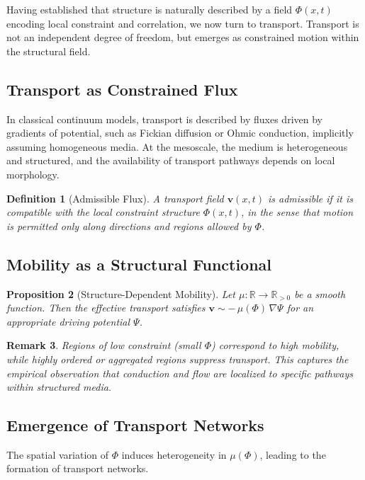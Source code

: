 \documentclass[11pt, a4paper, twocolumn]{article}
\newtheorem{definition}{Definition}[section]
\newtheorem{proposition}[definition]{Proposition}
\newtheorem{remark}[definition]{Remark}
\begin{document}
Having established that structure is naturally described by a field $\Phi(x,t)$
encoding local constraint and correlation, we now turn to transport. Transport
is not an independent degree of freedom, but emerges as constrained motion
within the structural field.

\subsection{Transport as Constrained Flux}

In classical continuum models, transport is described by fluxes driven by
gradients of potential, such as Fickian diffusion or Ohmic conduction, implicitly
assuming homogeneous media. At the mesoscale, the medium is heterogeneous and
structured, and the availability of transport pathways depends on local
morphology.

\begin{definition}[Admissible Flux]
A transport field $\mathbf{v}(x,t)$ is admissible if it is compatible with
the local constraint structure $\Phi(x,t)$, in the sense that motion is
permitted only along directions and regions allowed by $\Phi$.
\end{definition}

\subsection{Mobility as a Structural Functional}

\begin{proposition}[Structure-Dependent Mobility]
Let $\mu : \mathbb{R} \to \mathbb{R}_{>0}$ be a smooth function. Then the
effective transport satisfies $\mathbf{v} \sim -\,\mu(\Phi)\,\nabla \Psi$
for an appropriate driving potential $\Psi$.
\end{proposition}

\begin{remark}
Regions of low constraint (small $\Phi$) correspond to high mobility, while
highly ordered or aggregated regions suppress transport. This captures the
empirical observation that conduction and flow are localized to specific
pathways within structured media.
\end{remark}

\subsection{Emergence of Transport Networks}

The spatial variation of $\Phi$ induces heterogeneity in $\mu(\Phi)$,
leading to the formation of transport networks.
\end{document}
